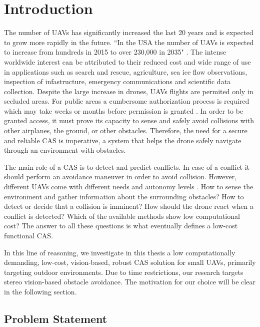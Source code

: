 \chapter{Introduction}
\label{ch:intro}
\acresetall

The number of \acp{UAV} has significantly increased the last 20 years and is expected to grow more rapidly in the future. ``In the USA the number of UAVs is expected to increase from hundreds in 2015 to over 230,000 in 2035" \cite{H.Sawalmeh2018b}. The intense worldwide interest can be attributed to their reduced cost and wide range of use in applications such as search and rescue, agriculture, sea ice flow observations, inspection of infastructure, emergency communications and scientific data collection. Despite the large increase in drones, \acp{UAV} flights are permited only in secluded areas. For public areas a cumbersome authorization process is required which may take weeks or months before permission is granted \cite{Imen2016b}. In order to be granted access, it must prove its capacity to sense and safely avoid collisions with other airplanes, the ground, or other obstacles. Therefore, the need for a secure and reliable \ac{CAS} is imperative, a system that helps the drone safely navigate through an environment with obstacles.

The main role of a \ac{CAS} is to detect and predict conflicts. In case of a conflict it should perform an avoidance maneuver in order to avoid collision. However, different \acp{UAV} come with different needs and autonomy levels \cite{Albaker2009b}. How to sense the environment and gather information about the surrounding obstacles? How to detect or decide that a collision is imminent? How should the drone react when a conflict is detected? Which of the available methods show low computational cost? The answer to all these questions is what eventually defines a low-cost functional \acl{CAS}. 

In this line of reasoning, we investigate in this thesis a low computationally demanding, low-cost, vision-based, robust \acs{CAS} solution for small \acp{UAV}, primarily targeting outdoor environments. Due to time restrictions, our research targets stereo vision-based obstacle avoidance. The motivation for our choice will be clear in the following section.



\section{Problem Statement}
\label{ch:intro:problem}

